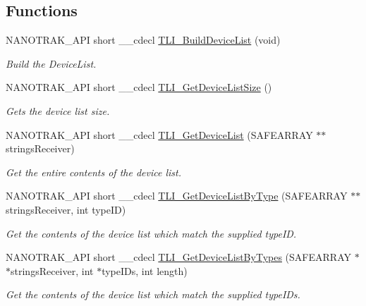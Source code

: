\subsection*{Functions}
\begin{DoxyCompactItemize}
\item 
N\+A\+N\+O\+T\+R\+A\+K\+\_\+\+A\+PI short \+\_\+\+\_\+cdecl \hyperlink{group___t_cube_nano_trak_gaefbb72e39fe49308163f8453a0e5631b}{T\+L\+I\+\_\+\+Build\+Device\+List} (void)
\begin{DoxyCompactList}\small\item\em Build the Device\+List. \end{DoxyCompactList}\item 
N\+A\+N\+O\+T\+R\+A\+K\+\_\+\+A\+PI short \+\_\+\+\_\+cdecl \hyperlink{group___t_cube_nano_trak_gabf6dcf80082ce537f5e57f55086cee2c}{T\+L\+I\+\_\+\+Get\+Device\+List\+Size} ()
\begin{DoxyCompactList}\small\item\em Gets the device list size. \end{DoxyCompactList}\item 
N\+A\+N\+O\+T\+R\+A\+K\+\_\+\+A\+PI short \+\_\+\+\_\+cdecl \hyperlink{group___t_cube_nano_trak_ga987f5b3e524ce131617d1b043f89a79a}{T\+L\+I\+\_\+\+Get\+Device\+List} (S\+A\+F\+E\+A\+R\+R\+AY $\ast$$\ast$strings\+Receiver)
\begin{DoxyCompactList}\small\item\em Get the entire contents of the device list. \end{DoxyCompactList}\item 
N\+A\+N\+O\+T\+R\+A\+K\+\_\+\+A\+PI short \+\_\+\+\_\+cdecl \hyperlink{group___t_cube_nano_trak_gab3a1a58215614627f9d218484ef91b9d}{T\+L\+I\+\_\+\+Get\+Device\+List\+By\+Type} (S\+A\+F\+E\+A\+R\+R\+AY $\ast$$\ast$strings\+Receiver, int type\+ID)
\begin{DoxyCompactList}\small\item\em Get the contents of the device list which match the supplied type\+ID. \end{DoxyCompactList}\item 
N\+A\+N\+O\+T\+R\+A\+K\+\_\+\+A\+PI short \+\_\+\+\_\+cdecl \hyperlink{group___t_cube_nano_trak_ga779abd99fb6e2e68fcd7586ea2d2d742}{T\+L\+I\+\_\+\+Get\+Device\+List\+By\+Types} (S\+A\+F\+E\+A\+R\+R\+AY $\ast$$\ast$strings\+Receiver, int $\ast$type\+I\+Ds, int length)
\begin{DoxyCompactList}\small\item\em Get the contents of the device list which match the supplied type\+I\+Ds. \end{DoxyCompactList}\item 
$$
\end{DoxyCompactItemize}
